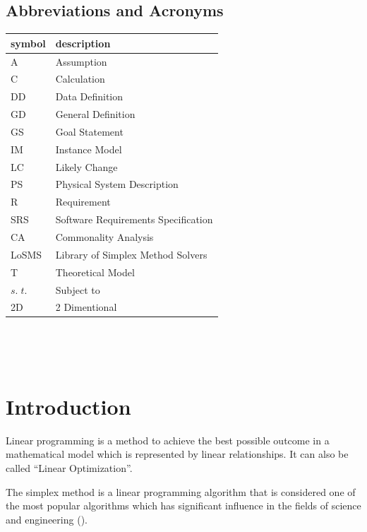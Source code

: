 \documentclass[12pt]{article}
\newcommand{\famname}{LoSMS} %
\begin{document}
\subsection{Abbreviations and Acronyms}

\renewcommand{\arraystretch}{1.2}
\begin{tabular}{l l} 
  \toprule		
  \textbf{symbol} & \textbf{description}\\
  \midrule 
  A & Assumption\\
  C & Calculation \\
  DD & Data Definition\\
  GD & General Definition\\
  GS & Goal Statement\\
  IM & Instance Model\\
  LC & Likely Change\\
  PS & Physical System Description\\
  R & Requirement\\
  SRS & Software Requirements Specification\\
  CA & Commonality Analysis\\
  \famname{} & Library of Simplex Method Solvers\\
  T & Theoretical Model\\
  $s.\;t.$ & Subject to\\
  2D & 2 Dimentional \\
  \bottomrule
\end{tabular}\\

\newpage

\tableofcontents

\listoftables

\listoffigures

~\newpage


\section{Introduction}

Linear programming is a method to achieve the best possible outcome in a 
mathematical model which is represented by linear relationships. It can also be 
called ``Linear Optimization''.

The simplex method is a linear programming algorithm that is considered one of 
the most popular algorithms which has significant influence in the fields of 
science and engineering (\cite{simplex-popularity}).
\end{document}
